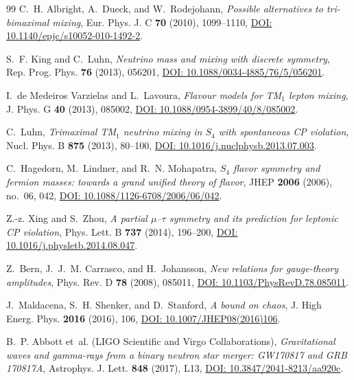 \documentclass[11pt,a4paper,reqno]{amsart}
\theoremstyle{definition}
\numberwithin{equation}{section}
\begin{document}
\begin{thebibliography}{99}
C.~H. Albright, A.~Dueck, and W.~Rodejohann,
\emph{Possible alternatives to tri-bimaximal mixing},
Eur. Phys. J. C \textbf{70} (2010), 1099--1110, \href{https://doi.org/10.1140/epjc/s10052-010-1492-2}{DOI: 10.1140/epjc/s10052-010-1492-2}.

S.~F. King and C.~Luhn,
\emph{Neutrino mass and mixing with discrete symmetry},
Rep. Prog. Phys. \textbf{76} (2013), 056201, \href{https://doi.org/10.1088/0034-4885/76/5/056201}{DOI: 10.1088/0034-4885/76/5/056201}.

I.~de Medeiros Varzielas and L.~Lavoura,
\emph{Flavour models for TM$_1$ lepton mixing},
J. Phys. G \textbf{40} (2013), 085002, \href{https://doi.org/10.1088/0954-3899/40/8/085002}{DOI: 10.1088/0954-3899/40/8/085002}.

C.~Luhn,
\emph{Trimaximal TM$_1$ neutrino mixing in $S_4$ with spontaneous CP violation},
Nucl. Phys. B \textbf{875} (2013), 80--100, \href{https://doi.org/10.1016/j.nuclphysb.2013.07.003}{DOI: 10.1016/j.nuclphysb.2013.07.003}.

C.~Hagedorn, M.~Lindner, and R.~N. Mohapatra,
\emph{$S_4$ flavor symmetry and fermion masses: towards a grand unified theory of flavor},
JHEP \textbf{2006} (2006), no.~06, 042, \href{https://doi.org/10.1088/1126-6708/2006/06/042}{DOI: 10.1088/1126-6708/2006/06/042}.

Z.-z. Xing and S.~Zhou,
\emph{A partial $\mu$--$\tau$ symmetry and its prediction for leptonic CP violation},
Phys. Lett. B \textbf{737} (2014), 196--200, \href{https://doi.org/10.1016/j.physletb.2014.08.047}{DOI: 10.1016/j.physletb.2014.08.047}.

Z.~Bern, J.~J.~M. Carrasco, and H.~Johansson,
\emph{New relations for gauge-theory amplitudes},
Phys. Rev. D \textbf{78} (2008), 085011, \href{https://doi.org/10.1103/PhysRevD.78.085011}{DOI: 10.1103/PhysRevD.78.085011}.

J.~Maldacena, S.~H. Shenker, and D.~Stanford,
\emph{A bound on chaos},
J. High Energ. Phys. \textbf{2016} (2016), 106, \href{https://doi.org/10.1007/JHEP08(2016)106}{DOI: 10.1007/JHEP08(2016)106}.

B.~P. Abbott et~al. (LIGO Scientific and Virgo Collaborations),
\emph{Gravitational waves and gamma-rays from a binary neutron star merger: GW170817 and GRB 170817A},
Astrophys. J. Lett. \textbf{848} (2017), L13, \href{https://doi.org/10.3847/2041-8213/aa920c}{DOI: 10.3847/2041-8213/aa920c}.


\end{thebibliography}
\end{document}
